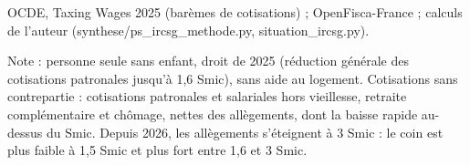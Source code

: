 OCDE, Taxing Wages 2025 (barèmes de cotisations) ; OpenFisca-France ; calculs de l'auteur (synthese/ps\_ircsg\_methode.py, situation\_ircsg.py).\par Note : personne seule sans enfant, droit de 2025 (réduction générale des cotisations patronales jusqu'à 1,6 Smic), sans aide au logement. Cotisations sans contrepartie : cotisations patronales et salariales hors vieillesse, retraite complémentaire et chômage, nettes des allègements, dont la baisse rapide au-dessus du Smic. Depuis 2026, les allègements s'éteignent à 3 Smic : le coin est plus faible à 1,5 Smic et plus fort entre 1,6 et 3 Smic.
